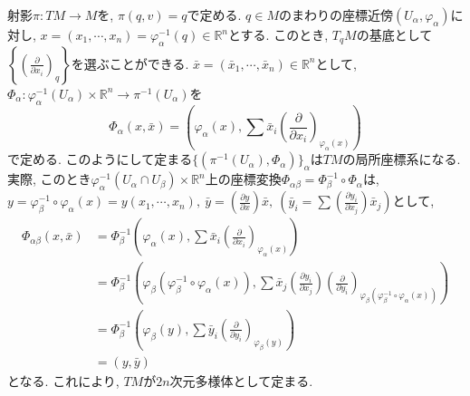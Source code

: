 \documentclass[a4paper]{ujarticle}
\numberwithin{equation}{section}
\theoremstyle{definition}
\begin{document}
        射影$\pi: TM \rightarrow M$を, $\pi(q, v) = q$で定める. 
        $q \in M$のまわりの座標近傍$(U_{\alpha}, \varphi_{\alpha})$に対し, 
        $x = (x_1, \cdots, x_n) = \varphi_{\alpha}^{-1}(q) \in \mathbb{R}^n$とする.
        このとき, $T_{q} M$の基底として$\displaystyle \left\{ \left(\frac{\partial}{\partial x_i}\right)_q \right\}$を選ぶことができる.
        $\bar{x} = (\bar{x}_1, \cdots, \bar{x}_{n})\in \mathbb{R}^n$として,
        $\Phi_{\alpha}: \varphi_{\alpha}^{-1}(U_{\alpha}) \times \mathbb{R}^n \rightarrow \pi^{-1}(U_{\alpha})$を
        \[
            \Phi_{\alpha}(x, \bar{x}) = \left(\varphi_{\alpha}(x), \sum \bar{x}_i \left(\frac{\partial}{\partial x_i}\right)_{\varphi_{\alpha}(x)} \right)
        \]
        で定める. このようにして定まる$\{(\pi^{-1}(U_{\alpha}), \Phi_{\alpha})\}_{\alpha}$は$TM$の局所座標系になる.
        実際, このとき$\varphi_{\alpha}^{-1}(U_{\alpha} \cap U_{\beta}) \times \mathbb{R}^n$上の座標変換$\Phi_{\alpha \beta} = \Phi_{\beta}^{-1} \circ \Phi_{\alpha}$は,
        $\displaystyle y = \varphi_{\beta}^{-1} \circ \varphi_{\alpha}(x) = y(x_1, \cdots, x_n), \ \bar{y} = \left(\frac{\partial y}{\partial x}\right) \bar{x}, \ ( \bar{y}_i= \sum \left(\frac{\partial y_i}{\partial x_j}\right) \bar{x}_j)$として, 
        \begin{align}
            \Phi_{\alpha \beta}(x, \bar{x}) 
            &= \Phi_{\beta}^{-1}\left(\varphi_{\alpha}(x), \sum \bar{x}_i \left(\frac{\partial}{\partial x_i}\right)_{\varphi_{\alpha}(x)} \right)\\
            &= \Phi_{\beta}^{-1}\left(\varphi_{\beta}(\varphi_{\beta}^{-1} \circ \varphi_{\alpha}(x)), \sum \bar{x}_j \left(\frac{\partial y_i}{\partial x_j}\right) \left(\frac{\partial}{\partial y_i}\right)_{\varphi_{\beta}(\varphi_{\beta}^{-1} \circ \varphi_{\alpha}(x))} \right)\\
            &= \Phi_{\beta}^{-1}\left(\varphi_{\beta}(y), \sum \bar{y}_i \left(\frac{\partial}{\partial y_i}\right)_{\varphi_{\beta}(y)} \right) \\
            &= (y, \bar{y})
        \end{align}
        となる.
        これにより, $TM$が$2n$次元多様体として定まる. 
\end{document}
